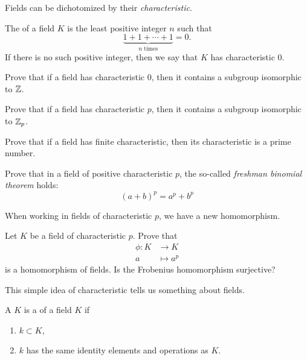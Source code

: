 \documentclass{ximera}
\begin{document}
Fields can be dichotomized by their \textit{characteristic}.

\begin{definition}
The  of a field $K$ is the least positive
integer $n$ such that
\[
\underbrace{1 + 1 + \cdots +1}_{\text{$n$ times}} =0.
\]
If there is no such positive integer, then we say that $K$ has
characteristic $0$.
\end{definition}


\begin{exercise}
  Prove that if a field has characteristic $0$, then it contains a
  subgroup isomorphic to $\mathbb Z$.
\end{exercise}

\begin{exercise}
  Prove that if a field has characteristic $p$, then it contains a
  subgroup isomorphic to $\mathbb Z_p$.
\end{exercise}



\begin{exercise} 
Prove that if a field has finite characteristic, then its
characteristic is a prime number.
\end{exercise}

\begin{exercise}\label{E:FBT}
Prove that in a field of positive characteristic $p$, the so-called
\textit{freshman binomial theorem} holds:
\[
(a+b)^p = a^p + b^p
\]
\end{exercise}



When working in fields of characteristic $p$, we have a new
homomorphism.

\begin{example}
  Let $K$ be a field of characteristic $p$. Prove that
  \begin{align*}
    \phi:K &\to K\\
    a &\mapsto a^p
  \end{align*}
  is a homomorphism of fields. Is the Frobenius homomorphism surjective?
\end{example}





This simple idea of characteristic tells us something about fields.

\begin{definition}
  A $K$ is a  of a field $K$ if
  \begin{enumerate}
  \item $k\subset K$,
  \item $k$ has the same identity elements and operations as $K$.
  \end{enumerate}
\end{definition}
\end{document}
